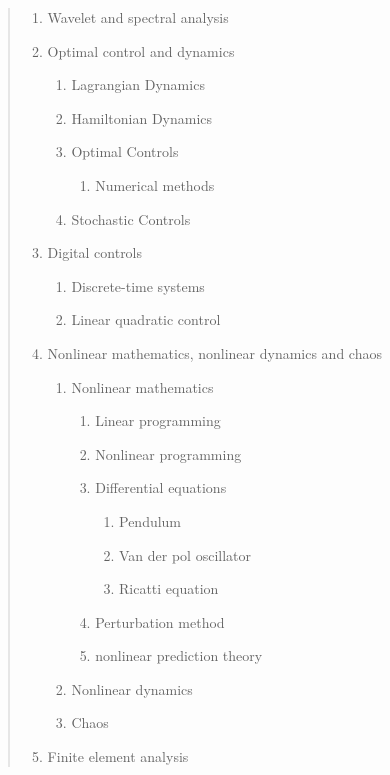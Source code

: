 \documentclass[11pt]{report}
\begin{document}
\begin{abstract}
\begin{enumerate}
	\item Wavelet and spectral analysis
	\item Optimal control and dynamics
		\begin{enumerate}
			\item Lagrangian Dynamics
			\item Hamiltonian Dynamics
			\item Optimal Controls
				\begin{enumerate}
					\item Numerical methods
				\end{enumerate}
			\item Stochastic Controls
		\end{enumerate}
	\item Digital controls
		\begin{enumerate}
			\item Discrete-time systems
			\item Linear quadratic control
		\end{enumerate}
	\item Nonlinear mathematics, nonlinear dynamics and chaos
		\begin{enumerate}
		 	\item Nonlinear mathematics
		 		\begin{enumerate}
					\item Linear programming
					\item Nonlinear programming
					\item Differential equations
						\begin{enumerate}
							\item Pendulum
							\item Van der pol oscillator
							\item Ricatti equation
						\end{enumerate}
					\item Perturbation method
					\item nonlinear prediction theory
				\end{enumerate}		
			\item Nonlinear dynamics
			\item Chaos
		\end{enumerate}
	\item Finite element analysis
\end{enumerate}

\end{abstract}
\end{document}
